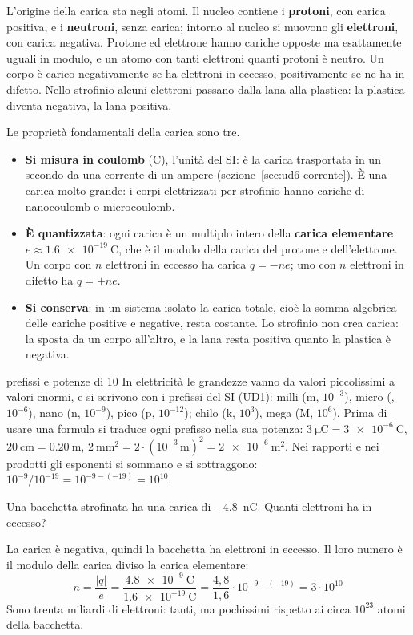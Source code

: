 L'origine della carica sta negli atomi. Il nucleo contiene i \textbf{protoni}, con carica positiva, e i \textbf{neutroni}, senza carica; intorno al nucleo si muovono gli \textbf{elettroni}, con carica negativa. Protone ed elettrone hanno cariche opposte ma esattamente uguali in modulo, e un atomo con tanti elettroni quanti protoni è neutro. Un corpo è carico negativamente se ha elettroni in eccesso, positivamente se ne ha in difetto. Nello strofinio alcuni elettroni passano dalla lana alla plastica: la plastica diventa negativa, la lana positiva.

Le proprietà fondamentali della carica sono tre.
\begin{itemize}
  \item \textbf{Si misura in coulomb} (\si{\coulomb}), l'unità del SI: è la carica trasportata in un secondo da una corrente di un ampere (sezione~\ref{sec:ud6-corrente}). È una carica molto grande: i corpi elettrizzati per strofinio hanno cariche di nanocoulomb o microcoulomb.
  \item \textbf{È quantizzata}: ogni carica è un multiplo intero della \textbf{carica elementare} $e \approx \SI{1,6e-19}{\coulomb}$, che è il modulo della carica del protone e dell'elettrone. Un corpo con $n$ elettroni in eccesso ha carica $q = -ne$; uno con $n$ elettroni in difetto ha $q = +ne$.
  \item \textbf{Si conserva}: in un sistema isolato la carica totale, cioè la somma algebrica delle cariche positive e negative, resta costante. Lo strofinio non crea carica: la sposta da un corpo all'altro, e la lana resta positiva quanto la plastica è negativa.
\end{itemize}

\begin{richiamo}{prefissi e potenze di 10}
In elettricità le grandezze vanno da valori piccolissimi a valori enormi, e si scrivono con i prefissi del SI (UD1): milli (m, $10^{-3}$), micro (\textmu, $10^{-6}$), nano (n, $10^{-9}$), pico (p, $10^{-12}$); chilo (k, $10^{3}$), mega (M, $10^{6}$). Prima di usare una formula si traduce ogni prefisso nella sua potenza: $\SI{3}{\micro\coulomb} = \SI{3e-6}{\coulomb}$, $\SI{20}{\centi\metre} = \SI{0,20}{\metre}$, $\SI{2}{\milli\metre\squared} = 2 \cdot (10^{-3}\,\si{\metre})^{2} = \SI{2e-6}{\metre\squared}$. Nei rapporti e nei prodotti gli esponenti si sommano e si sottraggono: $10^{-9}/10^{-19} = 10^{-9-(-19)} = 10^{10}$.
\end{richiamo}

\begin{esempio}
Una bacchetta strofinata ha una carica di \SI{-4,8}{\nano\coulomb}. Quanti elettroni ha in eccesso?

La carica è negativa, quindi la bacchetta ha elettroni in eccesso. Il loro numero è il modulo della carica diviso la carica elementare:
\[
  n = \frac{|q|}{e} = \frac{\SI{4,8e-9}{\coulomb}}{\SI{1,6e-19}{\coulomb}} = \frac{4{,}8}{1{,}6} \cdot 10^{-9-(-19)} = 3 \cdot 10^{10}
\]
Sono trenta miliardi di elettroni: tanti, ma pochissimi rispetto ai circa $10^{23}$ atomi della bacchetta.
\end{esempio}

